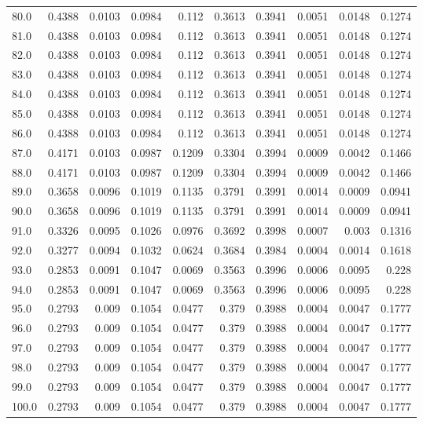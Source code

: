\begin{longtable}{lrrrrrrrrr}
80.0 & 0.4388 & 0.0103 & 0.0984 & 0.112 & 0.3613 & 0.3941 & 0.0051 & 0.0148 & 0.1274 \\
81.0 & 0.4388 & 0.0103 & 0.0984 & 0.112 & 0.3613 & 0.3941 & 0.0051 & 0.0148 & 0.1274 \\
82.0 & 0.4388 & 0.0103 & 0.0984 & 0.112 & 0.3613 & 0.3941 & 0.0051 & 0.0148 & 0.1274 \\
83.0 & 0.4388 & 0.0103 & 0.0984 & 0.112 & 0.3613 & 0.3941 & 0.0051 & 0.0148 & 0.1274 \\
84.0 & 0.4388 & 0.0103 & 0.0984 & 0.112 & 0.3613 & 0.3941 & 0.0051 & 0.0148 & 0.1274 \\
85.0 & 0.4388 & 0.0103 & 0.0984 & 0.112 & 0.3613 & 0.3941 & 0.0051 & 0.0148 & 0.1274 \\
86.0 & 0.4388 & 0.0103 & 0.0984 & 0.112 & 0.3613 & 0.3941 & 0.0051 & 0.0148 & 0.1274 \\
87.0 & 0.4171 & 0.0103 & 0.0987 & 0.1209 & 0.3304 & 0.3994 & 0.0009 & 0.0042 & 0.1466 \\
88.0 & 0.4171 & 0.0103 & 0.0987 & 0.1209 & 0.3304 & 0.3994 & 0.0009 & 0.0042 & 0.1466 \\
89.0 & 0.3658 & 0.0096 & 0.1019 & 0.1135 & 0.3791 & 0.3991 & 0.0014 & 0.0009 & 0.0941 \\
90.0 & 0.3658 & 0.0096 & 0.1019 & 0.1135 & 0.3791 & 0.3991 & 0.0014 & 0.0009 & 0.0941 \\
91.0 & 0.3326 & 0.0095 & 0.1026 & 0.0976 & 0.3692 & 0.3998 & 0.0007 & 0.003 & 0.1316 \\
92.0 & 0.3277 & 0.0094 & 0.1032 & 0.0624 & 0.3684 & 0.3984 & 0.0004 & 0.0014 & 0.1618 \\
93.0 & 0.2853 & 0.0091 & 0.1047 & 0.0069 & 0.3563 & 0.3996 & 0.0006 & 0.0095 & 0.228 \\
94.0 & 0.2853 & 0.0091 & 0.1047 & 0.0069 & 0.3563 & 0.3996 & 0.0006 & 0.0095 & 0.228 \\
95.0 & 0.2793 & 0.009 & 0.1054 & 0.0477 & 0.379 & 0.3988 & 0.0004 & 0.0047 & 0.1777 \\
96.0 & 0.2793 & 0.009 & 0.1054 & 0.0477 & 0.379 & 0.3988 & 0.0004 & 0.0047 & 0.1777 \\
97.0 & 0.2793 & 0.009 & 0.1054 & 0.0477 & 0.379 & 0.3988 & 0.0004 & 0.0047 & 0.1777 \\
98.0 & 0.2793 & 0.009 & 0.1054 & 0.0477 & 0.379 & 0.3988 & 0.0004 & 0.0047 & 0.1777 \\
99.0 & 0.2793 & 0.009 & 0.1054 & 0.0477 & 0.379 & 0.3988 & 0.0004 & 0.0047 & 0.1777 \\
100.0 & 0.2793 & 0.009 & 0.1054 & 0.0477 & 0.379 & 0.3988 & 0.0004 & 0.0047 & 0.1777 \\

\end{longtable}
